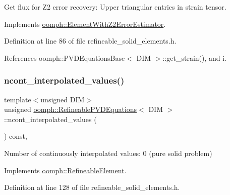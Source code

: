 Get \textquotesingle{}flux\textquotesingle{} for Z2 error recovery\+: Upper triangular entries in strain tensor. 



Implements \hyperlink{classoomph_1_1ElementWithZ2ErrorEstimator_a5688ff5f546d81771cabad82ca5a7556}{oomph\+::\+Element\+With\+Z2\+Error\+Estimator}.



Definition at line 86 of file refineable\+\_\+solid\+\_\+elements.\+h.



References oomph\+::\+P\+V\+D\+Equations\+Base$<$ D\+I\+M $>$\+::get\+\_\+strain(), and i.

\mbox{\label{classoomph_1_1RefineablePVDEquations_af30374314ac9d9805702d9fde7cb1cef}} 
\subsubsection{\texorpdfstring{ncont\+\_\+interpolated\+\_\+values()}{ncont\_interpolated\_values()}}
{\footnotesize\ttfamily template$<$unsigned D\+IM$>$ \\
unsigned \hyperlink{classoomph_1_1RefineablePVDEquations}{oomph\+::\+Refineable\+P\+V\+D\+Equations}$<$ D\+IM $>$\+::ncont\+\_\+interpolated\+\_\+values (\begin{DoxyParamCaption}{ }\end{DoxyParamCaption}) const\hspace{0.3cm}{\ttfamily [inline]}, {\ttfamily [virtual]}}



Number of continuously interpolated values\+: 0 (pure solid problem) 



Implements \hyperlink{classoomph_1_1RefineableElement_a53e171a18c9f43f1db90a6876516a073}{oomph\+::\+Refineable\+Element}.



Definition at line 128 of file refineable\+\_\+solid\+\_\+elements.\+h.

\mbox{\label{classoomph_1_1RefineablePVDEquations_a1c3251344b800eff097da2ce76a127fc}} 
